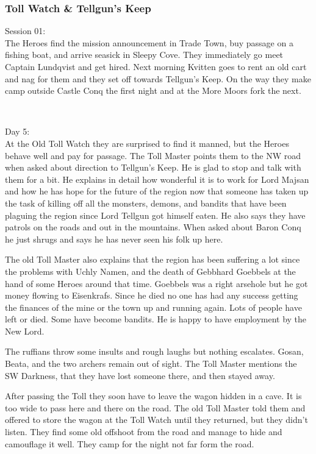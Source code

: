 \subsubsection*{Toll Watch \& Tellgun's Keep}
\forceindent Session 01:\\                                              %
The Heroes find the mission announcement in Trade Town, buy passage on a fishing boat, and arrive seasick in Sleepy Cove. They immediately go meet Captain Lundqvist and get hired.
Next morning Kvitten goes to rent an old cart and nag for them and they set off towards Tellgun's Keep. On the way they make camp outside Castle Conq the first night and at the More Moors fork the next.

\

Day 5:\\
At the Old Toll Watch they are surprised to find it manned, but the Heroes behave well and pay for passage. The Toll Master points them to the NW road when asked about direction to Tellgun's Keep. He is glad to stop and talk with them for a bit. He explains in detail how wonderful it is to work for Lord Majsan and how he has hope for the future of the region now that someone has taken up the task of killing off all the monsters, demons, and bandits that have been plaguing the region since Lord Tellgun got himself eaten. He also says they have patrols on the roads and out in the mountains. When asked about Baron Conq he just shrugs and says he has never seen his folk up here.

The old Toll Master also explains that the region has been suffering a lot since the problems with Uchly Namen, and the death of Gebbhard Goebbels at the hand of some Heroes around that time. Goebbels was a right arsehole but he got money flowing to Eisenkrafs. Since he died no one has had any success getting the finances of the mine or the town up and running again. Lots of people have left or died. Some have become bandits. He is happy to have employment by the New Lord.

The ruffians throw some insults and rough laughs but nothing escalates. Gosan, Beata, and the two archers remain out of sight. The Toll Master mentions the SW Darkness, that they have lost someone there, and then stayed away.

After passing the Toll they soon have to leave the wagon hidden in a cave. It is too wide to pass here and there on the road. The old Toll Master told them and offered to store the wagon at the Toll Watch until they returned, but they didn't listen. They find some old offshoot from the road and manage to hide and camouflage it well. They camp for the night not far form the road.

